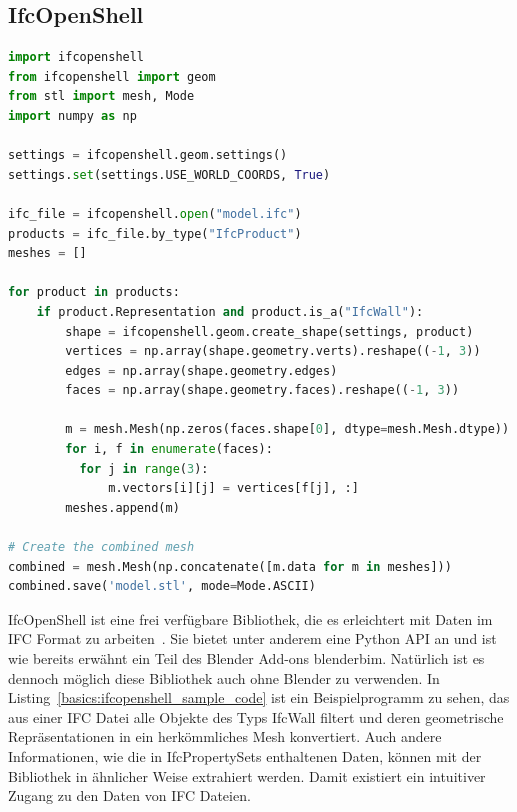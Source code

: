 \subsection{IfcOpenShell}\label{basics:ifcopenshell}
\begin{lstlisting}[label={basics:ifcopenshell_sample_code}, language=Python, caption=Beispielprogramm zur Extraktion bestimmter Daten einer IFC Datei und Generierung eines Meshes aus deren geometrischen Representationen.]
import ifcopenshell
from ifcopenshell import geom
from stl import mesh, Mode
import numpy as np

settings = ifcopenshell.geom.settings()
settings.set(settings.USE_WORLD_COORDS, True)

ifc_file = ifcopenshell.open("model.ifc")
products = ifc_file.by_type("IfcProduct")
meshes = []

for product in products:
    if product.Representation and product.is_a("IfcWall"):
        shape = ifcopenshell.geom.create_shape(settings, product)
        vertices = np.array(shape.geometry.verts).reshape((-1, 3))
        edges = np.array(shape.geometry.edges)
        faces = np.array(shape.geometry.faces).reshape((-1, 3))

        m = mesh.Mesh(np.zeros(faces.shape[0], dtype=mesh.Mesh.dtype))
        for i, f in enumerate(faces):
          for j in range(3):
              m.vectors[i][j] = vertices[f[j], :]
        meshes.append(m)

# Create the combined mesh
combined = mesh.Mesh(np.concatenate([m.data for m in meshes]))
combined.save('model.stl', mode=Mode.ASCII)

\end{lstlisting}

IfcOpenShell ist eine frei verfügbare Bibliothek, die es erleichtert mit Daten im IFC Format zu arbeiten~\cite{IFCOpenShell:online}.
Sie bietet unter anderem eine Python API an und ist wie bereits erwähnt ein Teil des Blender Add-ons blenderbim.
Natürlich ist es dennoch möglich diese Bibliothek auch ohne Blender zu verwenden.
In Listing~\ref{basics:ifcopenshell_sample_code} ist ein Beispielprogramm zu sehen, das aus einer IFC Datei alle Objekte des Typs IfcWall filtert und deren geometrische Repräsentationen in ein herkömmliches Mesh konvertiert.
Auch andere Informationen, wie die in IfcPropertySets enthaltenen Daten, können mit der Bibliothek in ähnlicher Weise extrahiert werden.
Damit existiert ein intuitiver Zugang zu den Daten von IFC Dateien.

